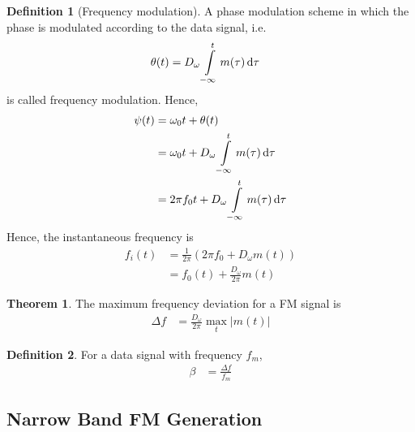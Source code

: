 \documentclass[titlepage, fleqn, a4paper, 12pt, twoside]{article}
\theoremstyle{definition}
\newtheorem{definition}{Definition}
\theoremstyle{theorem}
\newtheorem{theorem}{Theorem}
\begin{document}
\begin{definition}[Frequency modulation]
	A phase modulation scheme in which the phase is modulated according to the data signal, i.e.
	\begin{align*}
		\theta(t) &= D_{\omega} \int\limits_{-\infty}^{t} m(\tau) \dif \tau
	\end{align*}
	is called frequency modulation.
	Hence,
	\begin{align*}
		\psi(t) &= \omega_0 t + \theta(t)\\
		&= \omega_0 t + D_{\omega} \int\limits_{-\infty}^{t} m(\tau) \dif \tau\\
		&= 2 \pi f_0 t + D_{\omega} \int\limits_{-\infty}^{t} m(\tau) \dif \tau
	\end{align*}
	Hence, the instantaneous frequency is
	\begin{align*}
		f_i(t) &= \frac{1}{2 \pi} \left( 2 \pi f_0 + D_{\omega} m(t) \right)\\
		&= f_0(t) + \frac{D_{\omega}}{2 \pi} m(t)
	\end{align*}
\end{definition}

\begin{theorem}
	The maximum frequency deviation for a FM signal is
	\begin{align*}
		\Delta f &= \frac{D_{\omega}}{2 \pi} \max_{t} \left| m(t) \right|
	\end{align*}
\end{theorem}

\begin{definition}
	For a data signal with frequency $f_m$,
	\begin{align*}
		\beta &= \frac{\Delta f}{f_m}
	\end{align*}
\end{definition}

\subsection{Narrow Band FM Generation}
\end{document}
